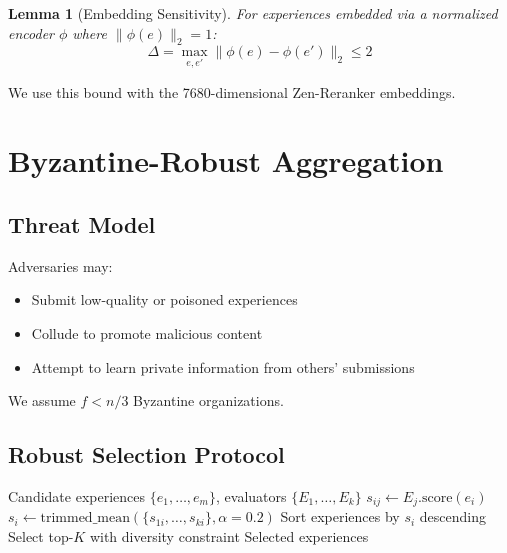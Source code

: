 \documentclass[11pt,letterpaper]{article}
\newtheorem{lemma}[theorem]{Lemma}
\begin{document}
\begin{lemma}[Embedding Sensitivity]
For experiences embedded via a normalized encoder $\phi$ where $\|\phi(e)\|_2 = 1$:
\begin{equation}
\Delta = \max_{e, e'} \|\phi(e) - \phi(e')\|_2 \leq 2
\end{equation}
\end{lemma}

We use this bound with the 7680-dimensional Zen-Reranker embeddings.

\section{Byzantine-Robust Aggregation}
\label{sec:byzantine}

\subsection{Threat Model}

Adversaries may:
\begin{itemize}
    \item Submit low-quality or poisoned experiences
    \item Collude to promote malicious content
    \item Attempt to learn private information from others' submissions
\end{itemize}

We assume $f < n/3$ Byzantine organizations.

\subsection{Robust Selection Protocol}

\begin{algorithm}
\caption{Byzantine-Robust Experience Selection}
\label{alg:byzantine}
\begin{algorithmic}[1]
\REQUIRE Candidate experiences $\{e_1, \ldots, e_m\}$, evaluators $\{E_1, \ldots, E_k\}$
        \STATE $s_{ij} \gets E_j.\text{score}(e_i)$ 
    \ENDFOR
    \STATE $s_i \gets \text{trimmed\_mean}(\{s_{1i}, \ldots, s_{ki}\}, \alpha=0.2)$
\ENDFOR
\STATE Sort experiences by $s_i$ descending
\STATE Select top-$K$ with diversity constraint
\RETURN Selected experiences
\end{algorithmic}
\end{algorithm}
\end{document}
